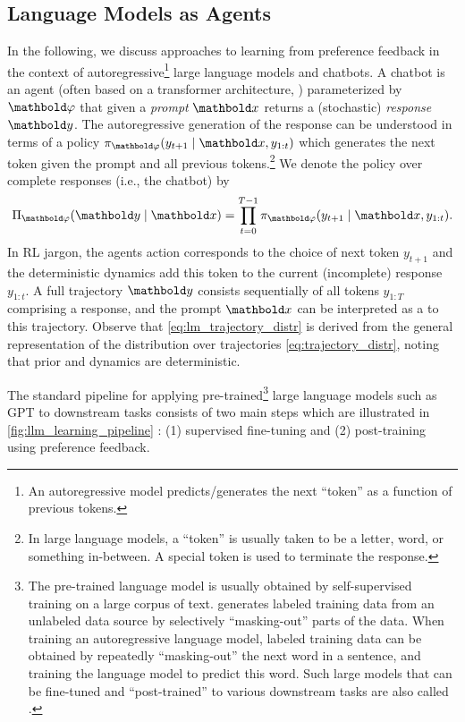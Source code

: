 \subsection{Language Models as Agents}

In the following, we discuss approaches to learning from preference feedback in the context of autoregressive\footnote{An autoregressive model predicts/generates the next ``token'' as a function of previous tokens.} large language models and chatbots.
A chatbot is an agent (often based on a transformer architecture, \cite{vaswani2017attention}) parameterized by $\vvarphi$ that given a \emph{prompt} $\vx$ returns a (stochastic) \emph{response} $\vy$.
The autoregressive generation of the response can be understood in terms of a policy $\pi_{\vvarphi}(y_{t+1} \mid \vx, y_{1:t})$ which generates the next token given the prompt and all previous tokens.\footnote{In large language models, a ``token'' is usually taken to be a letter, word, or something in-between. A special token is used to terminate the response.}
We denote the policy over complete responses (i.e., the chatbot) by \begin{align}
  \altpi_{\vvarphi}(\vy \mid \vx) = \prod_{t=0}^{T-1} \pi_{\vvarphi}(y_{t+1} \mid \vx, y_{1:t}). \label{eq:lm_trajectory_distr}
\end{align}
In RL jargon, the agents action corresponds to the choice of next token $y_{t+1}$ and the deterministic dynamics add this token to the current (incomplete) response $y_{1:t}$.
A full trajectory $\vy$ consists sequentially of all tokens $y_{1:T}$ comprising a response, and the prompt $\vx$ can be interpreted as a  to this trajectory.
Observe that \cref{eq:lm_trajectory_distr} is derived from the general representation of the distribution over trajectories \eqref{eq:trajectory_distr}, noting that prior and dynamics are deterministic.

The standard pipeline for applying pre-trained\footnote[][-3\baselineskip]{The pre-trained language model is usually obtained by self-supervised training on a large corpus of text.  generates labeled training data from an unlabeled data source by selectively ``masking-out'' parts of the data. When training an autoregressive language model, labeled training data can be obtained by repeatedly ``masking-out'' the next word in a sentence, and training the language model to predict this word. Such large models that can be fine-tuned and ``post-trained'' to various downstream tasks are also called .} large language models such as GPT \citep{openai2023gpt4} to downstream tasks consists of two main steps which are illustrated in \cref{fig:llm_learning_pipeline} \citep{stiennon2020learning}: (1) supervised fine-tuning and (2) post-training using preference feedback.


